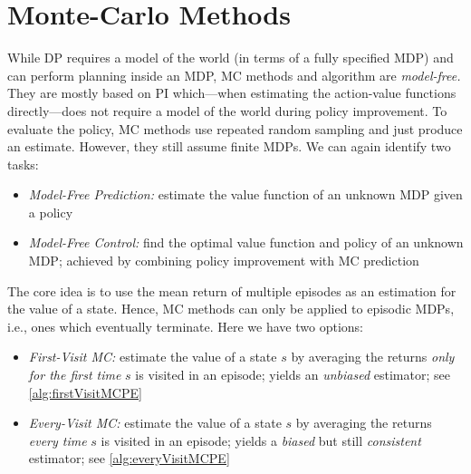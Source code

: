 \chapter{Monte-Carlo Methods}
	\label{c:mc}

	While \ac{DP} requires a model of the world (in terms of a fully specified \ac{MDP}) and can perform planning inside an \ac{MDP}, \ac{MC} methods and algorithm are \emph{model-free.} They are mostly based on \ac{PI} which---when estimating the action-value functions directly---does not require a model of the world during policy improvement. To evaluate the policy, \ac{MC} methods use repeated random sampling and just produce an estimate. However, they still assume finite \acp{MDP}. We can again identify two tasks:
	\begin{itemize}
		\item \emph{Model-Free Prediction:} estimate the value function of an unknown \ac{MDP} given a policy
		\item \emph{Model-Free Control:} find the optimal value function and policy of an unknown \ac{MDP}; achieved by combining policy improvement with \ac{MC} prediction
	\end{itemize}
	The core idea is to use the mean return of multiple episodes as an estimation for the value of a state. Hence, \ac{MC} methods can only be applied to episodic \acp{MDP}, i.e., ones which eventually terminate. Here we have two options:
	\begin{itemize}
		\item \emph{First-Visit \ac{MC}:} estimate the value of a state \(s\) by averaging the returns \emph{only for the first time} \(s\) is visited in an episode; yields an \emph{unbiased} estimator; see \autoref{alg:firstVisitMCPE}
		\item \emph{Every-Visit \ac{MC}:} estimate the value of a state \(s\) by averaging the returns \emph{every time} \(s\) is visited in an episode; yields a \emph{biased} but still \emph{consistent} estimator; see \autoref{alg:everyVisitMCPE}
	\end{itemize}

